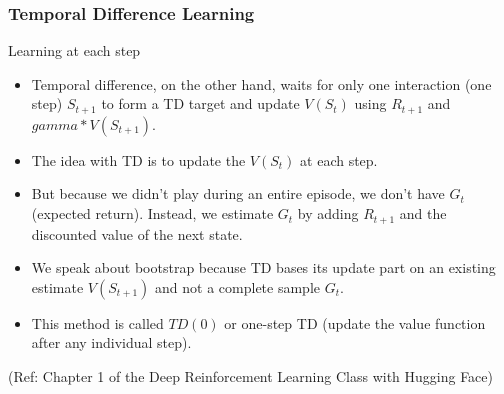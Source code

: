\begin{frame}[fragile]\frametitle{Temporal Difference Learning}

Learning at each step

\begin{itemize}
\item Temporal difference, on the other hand, waits for only one interaction (one step) $S_{t+1}$ to form a TD target and update $V(S_t)$ using $R_{t+1}$ and $gamma * V(S_{t+1})$.
\item The idea with TD is to update the $V(S_t)$ at each step.
\item But because we didn't play during an entire episode, we don't have $G_t$ (expected return). Instead, we estimate $G_t$ by adding $R_{t+1}$ and the discounted value of the next state.
\item We speak about bootstrap because TD bases its update part on an existing estimate $V(S_{t+1})$ and not a complete sample $G_t$.
\item This method is called $TD(0)$ or one-step TD (update the value function after any individual step).

\end{itemize}


{\tiny (Ref: Chapter 1 of the Deep Reinforcement Learning Class with Hugging Face)}

\end{frame}

